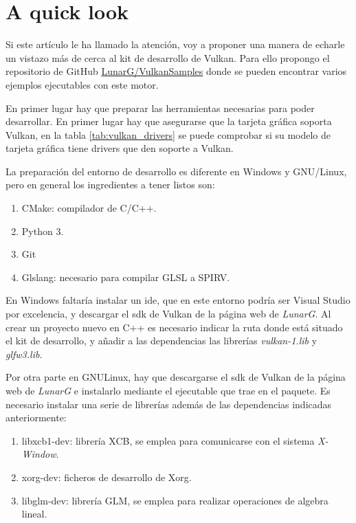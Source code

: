 \chapter{A quick look}
Si este artículo le ha llamado la atención, voy a proponer una manera de echarle un vistazo más de cerca al kit de
desarrollo de Vulkan. Para ello propongo el repositorio de GitHub \href{https://github.com/LunarG/VulkanSamples}{LunarG/VulkanSamples}
donde se pueden encontrar varios ejemplos ejecutables con este motor.

En primer lugar hay que preparar las herramientas necesarias para poder desarrollar. En primer lugar hay que asegurarse
que la tarjeta gráfica soporta Vulkan, en la tabla \ref{tab:vulkan_drivers} se puede comprobar si su modelo de tarjeta
gráfica tiene drivers que den soporte a Vulkan.

La preparación del entorno de desarrollo es diferente en Windows y GNU/Linux, pero en general los ingredientes a
tener listos son:
\begin{enumerate}
    \item CMake: compilador de C/C++.
    \item Python 3.
    \item Git
    \item Glslang: necesario para compilar GLSL a SPIRV.
\end{enumerate}

En Windows faltaría instalar un \gls{ide}, que en este entorno podría ser Visual Studio por excelencia, y descargar
el \gls{sdk} de Vulkan de la página web de \emph{LunarG}. Al crear un proyecto nuevo en C++ es necesario indicar la ruta
donde está situado el kit de desarrollo, y añadir a las dependencias las librerías
\emph{vulkan-1.lib} y \emph{glfw3.lib}.

Por otra parte en GNU\/Linux, hay que descargarse el \gls{sdk} de Vulkan de la página web de \emph{LunarG} e instalarlo
mediante el ejecutable que trae en el paquete. Es necesario instalar una serie de librerías además de las dependencias
indicadas anteriormente:

\begin{enumerate}
    \item libxcb1-dev: librería XCB, se emplea para comunicarse con el sistema \emph{X-Window}.
    \item xorg-dev: ficheros de desarrollo de Xorg.
    \item libglm-dev: librería GLM, se emplea para realizar operaciones de algebra lineal.
\end{enumerate}

